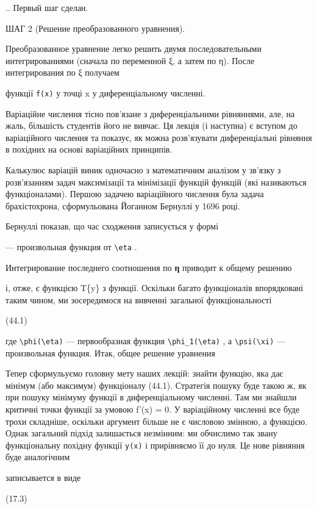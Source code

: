 \documentclass[
  ukrainian,
]{article}
\begin{document}
.. Первый шаг сделан.

ШАГ 2 (Решение преобразованного уравнения).

Преобразованное уравнение легко решить двумя последовательными
интегрированиями (сначала по переменной ξ, а затем по η). После
интегрирования по ξ получаем

функції \texttt{f(x)} у точці x у диференціальному численні.

Варіаційне числення тісно пов'язане з диференціальними рівняннями, але,
на жаль, більшість студентів його не вивчає. Ця лекція (і наступна) є
вступом до варіаційного числення та показує, як можна розв'язувати
диференціальні рівняння в похідних на основі варіаційних принципів.

Калькулюс варіацій виник одночасно з математичним аналізом у зв'язку з
розв'язанням задач максимізації та мінімізації функцій функцій (які
називаються функціоналами). Першою задачею варіаційного числення була
задача брахістохрона, сформульована Йоганном Бернуллі у 1696 році.

Бернуллі показав, що час сходження записується у формі

--- произвольная функция от \texttt{\textbackslash{}eta} .

Интегрирование последнего соотношения по \textbf{η} приводит к общему
решению

і, отже, є функцією T\{y\} з функції. Оскільки багато функціоналів
впорядковані таким чином, ми зосередимося на вивченні загальної
функціональності

(44.1)

где \texttt{\textbackslash{}phi(\textbackslash{}eta)} --- первообразная
функция \texttt{\textbackslash{}phi\_1(\textbackslash{}eta)} , а
\texttt{\textbackslash{}psi(\textbackslash{}xi)} --- произвольная
функция. Итак, общее решение уравнения

Тепер сформульуємо головну мету наших лекцій: знайти функцію, яка дає
мінімум (або максимум) функціоналу (44.1). Стратегія пошуку буде такою
ж, як при пошуку мінімуму функції в диференціальному численні. Там ми
знайшли критичні точки функції за умовою f'(x) = 0. У варіаційному
численні все буде трохи складніше, оскільки аргумент більше не є
числовою змінною, а функцією. Однак загальний підхід залишається
незмінним: ми обчислимо так звану функціональну похідну функції
\texttt{y(x)} і прирівняємо її до нуля. Це нове рівняння буде
аналогічним

записывается в виде

(17.3)
\end{document}
